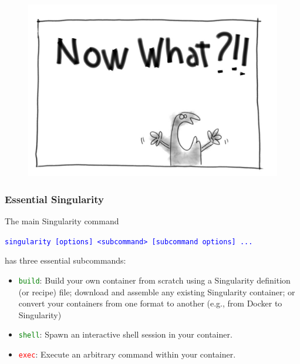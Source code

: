 \documentclass{beamer}
\begin{document}
\begin{frame}
   \frametitle{}
   \vspace{-1.0em}
   \begin{figure}[htbp]
      \includegraphics[width=1.0\textwidth]{images/now-what.jpg}
   \end{figure}
\end{frame}

\begin{frame}
   \frametitle{Essential Singularity}
   The main Singularity command
   \begin{center}
      \textcolor{blue}{\lstinline{singularity [options] <subcommand> [subcommand options] ...}}
   \end{center}
   has three essential subcommands:
   \begin{itemize}
      \setlength\itemsep{1.0em}
      \item \textcolor{green}{\lstinline{build}}: Build your own container
         from scratch using a Singularity definition (or recipe) file;
         download and assemble any existing Singularity container; or
         convert your containers from one format to another (e.g., from
         Docker to Singularity)
      \item \textcolor{green}{\lstinline{shell}}: Spawn an interactive shell
         session in your container.
      \item \textcolor{red}{\lstinline{exec}}: Execute an arbitrary
         command within your container.
   \end{itemize}
\end{frame}
\end{document}

